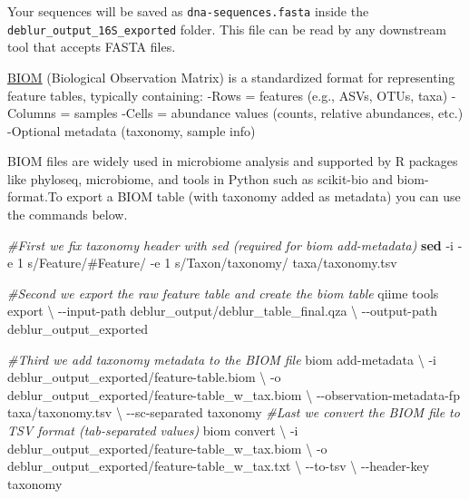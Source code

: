 \documentclass[
]{book}
\newenvironment{Shaded}{\begin{snugshade}}{\end{snugshade}}
\newcommand{\AttributeTok}[1]{\textcolor[rgb]{0.13,0.29,0.53}{#1}}
\newcommand{\CommentTok}[1]{\textcolor[rgb]{0.56,0.35,0.01}{\textit{#1}}}
\newcommand{\DataTypeTok}[1]{\textcolor[rgb]{0.13,0.29,0.53}{#1}}
\newcommand{\ExtensionTok}[1]{#1}
\newcommand{\FunctionTok}[1]{\textcolor[rgb]{0.13,0.29,0.53}{\textbf{#1}}}
\newcommand{\NormalTok}[1]{#1}
\newcommand{\StringTok}[1]{\textcolor[rgb]{0.31,0.60,0.02}{#1}}
\begin{document}
Your sequences will be saved as \texttt{dna-sequences.fasta} inside the \texttt{deblur\_output\_16S\_exported} folder. This file can be read by any downstream tool that accepts FASTA files.

\href{https://academic.oup.com/gigascience/article/1/1/2047-217X-1-7/2656152}{BIOM} (Biological Observation Matrix) is a standardized format for representing feature tables, typically containing:
-Rows = features (e.g., ASVs, OTUs, taxa)
-Columns = samples
-Cells = abundance values (counts, relative abundances, etc.)
-Optional metadata (taxonomy, sample info)

BIOM files are widely used in microbiome analysis and supported by R packages like phyloseq, microbiome, and tools in Python such as scikit-bio and biom-format.To export a BIOM table (with taxonomy added as metadata) you can use the commands below.

\begin{Shaded}
\begin{Highlighting}[]
\CommentTok{\#First we fix taxonomy header with sed (required for biom add{-}metadata)}
\FunctionTok{sed} \AttributeTok{{-}i} \AttributeTok{{-}e} \StringTok{\textquotesingle{}1 s/Feature/\#Feature/\textquotesingle{}} \AttributeTok{{-}e} \StringTok{\textquotesingle{}1 s/Taxon/taxonomy/\textquotesingle{}}\NormalTok{ taxa/taxonomy.tsv}

\CommentTok{\#Second we export the raw feature table and create the biom table}
\ExtensionTok{qiime}\NormalTok{ tools export }\DataTypeTok{\textbackslash{}}
   \AttributeTok{{-}{-}input{-}path}\NormalTok{ deblur\_output/deblur\_table\_final.qza }\DataTypeTok{\textbackslash{}}
   \AttributeTok{{-}{-}output{-}path}\NormalTok{ deblur\_output\_exported}

\CommentTok{\#Third we add taxonomy metadata to the BIOM file}
\ExtensionTok{biom}\NormalTok{ add{-}metadata }\DataTypeTok{\textbackslash{}}
   \AttributeTok{{-}i}\NormalTok{ deblur\_output\_exported/feature{-}table.biom }\DataTypeTok{\textbackslash{}}
   \AttributeTok{{-}o}\NormalTok{ deblur\_output\_exported/feature{-}table\_w\_tax.biom }\DataTypeTok{\textbackslash{}}
   \AttributeTok{{-}{-}observation{-}metadata{-}fp}\NormalTok{ taxa/taxonomy.tsv }\DataTypeTok{\textbackslash{}}
   \AttributeTok{{-}{-}sc{-}separated}\NormalTok{ taxonomy}
\CommentTok{\#Last we convert the BIOM file to TSV format (tab{-}separated values)}
\ExtensionTok{biom}\NormalTok{ convert }\DataTypeTok{\textbackslash{}}
   \AttributeTok{{-}i}\NormalTok{ deblur\_output\_exported/feature{-}table\_w\_tax.biom }\DataTypeTok{\textbackslash{}}
   \AttributeTok{{-}o}\NormalTok{ deblur\_output\_exported/feature{-}table\_w\_tax.txt }\DataTypeTok{\textbackslash{}}
   \AttributeTok{{-}{-}to{-}tsv} \DataTypeTok{\textbackslash{}}
   \AttributeTok{{-}{-}header{-}key}\NormalTok{ taxonomy}
\end{Highlighting}
\end{Shaded}
\end{document}
